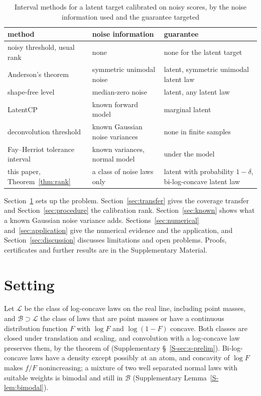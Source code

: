 \documentclass[12pt]{article}
\theoremstyle{definition}
\newcommand{\LC}{\mathcal{L}}
\newcommand{\B}{\mathcal{B}}
\begin{document}
\begin{table}[htbp]
\renewcommand{\baselinestretch}{1}
\caption{Interval methods for a latent target calibrated on noisy scores, by the noise information used and the guarantee targeted}
\label{tab:methods}
\centering
\fontsize{9}{11pt}\selectfont
\begin{tabular}{p{4.1cm}p{3.6cm}p{4.3cm}}
\toprule
method & noise information & guarantee \\
\midrule
noisy threshold, usual rank & none & none for the latent target \\
Anderson's theorem \citep{einbinder2024} & symmetric unimodal noise & latent, symmetric unimodal latent law \\
shape-free level \citep{guille2024} & median-zero noise & latent, any latent law \\
LatentCP \citep{zheng2026} & known forward model & marginal latent \\
deconvolution threshold \citep{cohen2025} & known Gaussian noise variances & none in finite samples \\
Fay--Herriot tolerance interval & known variances, normal model & under the model \\
this paper, Theorem~\ref{thm:rank} & a class of noise laws only & latent with probability $1 - \delta$, bi-log-concave latent law \\
\bottomrule
\end{tabular}
\end{table}

Section~\ref{sec:setting} sets up the problem. Section~\ref{sec:transfer} gives the coverage transfer and Section~\ref{sec:procedure} the calibration rank. Section~\ref{sec:known} shows what a known Gaussian noise variance adds. Sections~\ref{sec:numerical} and~\ref{sec:application} give the numerical evidence and the application, and Section~\ref{sec:discussion} discusses limitations and open problems. Proofs, certificates and further results are in the Supplementary Material.

\section{Setting}\label{sec:setting}

Let $\LC$ be the class of log-concave laws on the real line, including point masses, and $\B \supset \LC$ the class of laws that are point masses or have a continuous distribution function $F$ with $\log F$ and $\log(1 - F)$ concave. Both classes are closed under translation and scaling, and convolution with a log-concave law preserves them, by the theorem of \citet{prekopa1973} (Supplementary \S~\ref{S-sec:s-prelim}). Bi-log-concave laws have a density except possibly at an atom, and concavity of $\log F$ makes $f/F$ nonincreasing; a mixture of two well separated normal laws with suitable weights is bimodal and still in $\B$ (Supplementary Lemma~\ref{S-lem:bimodal}).
\end{document}
